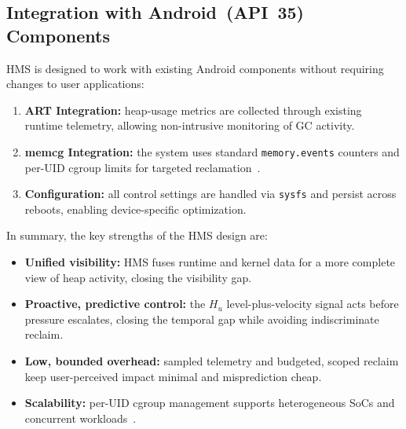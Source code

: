 \subsection{Integration with Android~(API~35) Components}
HMS is designed to work with existing Android components without requiring changes to user applications:
\begin{enumerate}
  \item \textbf{ART Integration:} heap-usage metrics are collected through existing runtime telemetry, allowing non-intrusive monitoring of GC activity.
  \item \textbf{memcg Integration:} the system uses standard \texttt{memory.events} counters and per-UID cgroup limits for targeted reclamation~\cite{TC_10851391}.
  \item \textbf{Configuration:} all control settings are handled via \texttt{sysfs} and persist across reboots, enabling device-specific optimization.
\end{enumerate}

\vspace{\baselineskip}
In summary, the key strengths of the HMS design are:
\begin{itemize}
  \item \textbf{Unified visibility:} HMS fuses runtime and kernel data for a more complete view of heap activity, closing the visibility gap.
  \item \textbf{Proactive, predictive control:} the $H_u$ level-plus-velocity signal acts before pressure escalates, closing the temporal gap while avoiding indiscriminate reclaim.
  \item \textbf{Low, bounded overhead:} sampled telemetry and budgeted, scoped reclaim keep user-perceived impact minimal and misprediction cheap.
  \item \textbf{Scalability:} per-UID cgroup management supports heterogeneous SoCs and concurrent workloads~\cite{TCE_Goswami2024_ResourceAlloc}.
\end{itemize}
